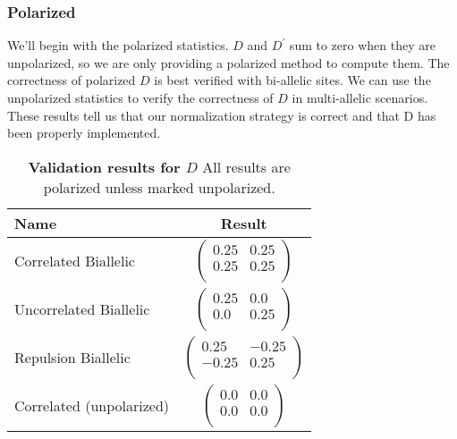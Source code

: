\documentclass[12pt]{article}
\begin{document}
\subsubsection{Polarized}
We'll begin with the polarized statistics. $D$ and $D^{\prime}$ sum to zero when
they are unpolarized, so we are only providing a polarized method to compute
them. The correctness of polarized $D$ is best verified with bi-allelic
sites. We can use the unpolarized statistics to verify the correctness of $D$ in
multi-allelic scenarios. These results tell us that our normalization strategy
is correct and that D has been properly implemented.

\begin{table}[H]
  \begin{tabular}{lc} Name & Result \\
    \hline
    Correlated Biallelic & $\left(\begin{array}{cc}
                                    0.25 & 0.25 \\
                                    0.25 & 0.25 \\
                                  \end{array}\right)$ \\
    Uncorrelated Biallelic & $\left(\begin{array}{cc}
                                      0.25 & 0.0 \\
                                      0.0 & 0.25 \\
                                    \end{array}\right)$ \\
    Repulsion Biallelic & $\left(\begin{array}{cc}
                                    0.25 & -0.25 \\
                                    -0.25 & 0.25 \\
                                 \end{array}\right)$ \\
    Correlated (unpolarized) & $\left(\begin{array}{cc}
                                        0.0 & 0.0 \\
                                        0.0 & 0.0 \\
                                      \end{array}\right)$ \\
  \end{tabular}
  \caption{
    \textbf{Validation results for $D$}
    All results are polarized unless marked unpolarized.
  }
\end{table}
\end{document}
